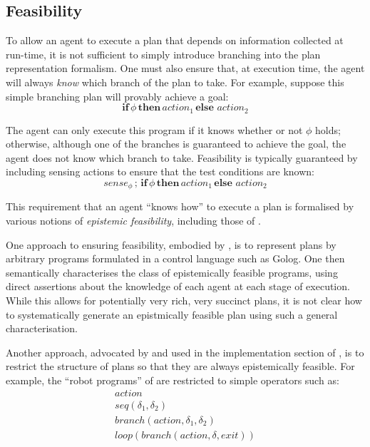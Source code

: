 \subsection{Feasibility\label{sec:JointExec:BG:Feasibility}}

To allow an agent to execute a plan that depends on information collected
at run-time, it is not sufficient to simply introduce branching into
the plan representation formalism. One must also ensure that, at execution
time, the agent will always \emph{know} which branch of the plan to
take. For example, suppose this simple branching plan will provably
achieve a goal:\[
\mathbf{if}\,\phi\,\mathbf{then}\, action_{1}\,\mathbf{else\,}\, action_{2}\]


The agent can only execute this program if it knows whether or not
$\phi$ holds; otherwise, although one of the branches is guaranteed
to achieve the goal, the agent does not know which branch to take.
Feasibility is typically guaranteed by including sensing actions to
ensure that the test conditions are known:\[
sense_{\phi}\,;\,\mathbf{if}\,\phi\,\mathbf{then}\, action_{1}\,\mathbf{else\,}\, action_{2}\]


This requirement that an agent {}``knows how'' to execute a plan
is formalised by various notions of \emph{epistemic feasibility},
including those of \citep{levesque98what_robots_can_do,levesque00knowing_how,Lesperance01epi_feas_casl,giacomo04sem_delib_indigolog,baier06programs_that_sense}.

One approach to ensuring feasibility, embodied by \citep{levesque00knowing_how,giacomo04sem_delib_indigolog,baier06programs_that_sense},
is to represent plans by arbitrary programs formulated in a control
language such as Golog. One then semantically characterises the class
of epistemically feasible programs, using direct assertions about
the knowledge of each agent at each stage of execution. While this
allows for potentially very rich, very succinct plans, it is not clear
how to systematically generate an epistmically feasible plan using
such a general characterisation.

Another approach, advocated by \citep{levesque96what_is_planning,levesque98what_robots_can_do}
and used in the implementation section of \citep{giacomo04sem_delib_indigolog},
is to restrict the structure of plans so that they are always epistemically
feasible. For example, the {}``robot programs'' of \citep{levesque98what_robots_can_do}
are restricted to simple operators such as:\begin{gather*}
action\\
seq(\delta_{1},\delta_{2})\\
branch(action,\delta_{1},\delta_{2})\\
loop(branch(action,\delta,exit))\end{gather*}


